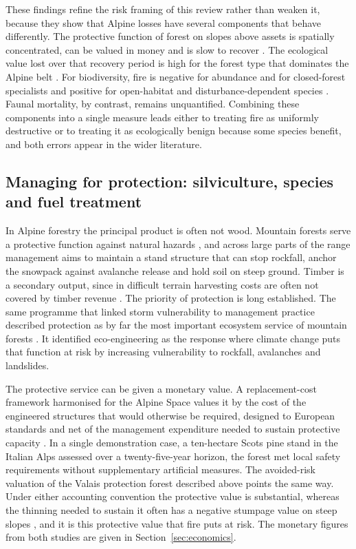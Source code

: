 \documentclass[11pt,a4paper]{article}
\begin{document}
These findings refine the risk framing of this review rather than weaken it, because they show that Alpine losses have several components that behave differently. The protective function of forest on slopes above assets is spatially concentrated, can be valued in money \citep{moos_climate_2021} and is slow to recover \citep{stritih_alternative_2023, degiuli_arrested_2024}. The ecological value lost over that recovery period is high for the forest type that dominates the Alpine belt \citep{arrogantefunes_mapping_2024}. For biodiversity, fire is negative for abundance and for closed-forest specialists and positive for open-habitat and disturbance-dependent species \citep{rey_effects_2019, degiuli_arrested_2024}. Faunal mortality, by contrast, remains unquantified. Combining these components into a single measure leads either to treating fire as uniformly destructive or to treating it as ecologically benign because some species benefit, and both errors appear in the wider literature.

\subsection{Managing for protection: silviculture, species and fuel treatment}

In Alpine forestry the principal product is often not wood. Mountain forests serve a protective function against natural hazards \citep{dinca_timber_2025}, and across large parts of the range management aims to maintain a stand structure that can stop rockfall, anchor the snowpack against avalanche release and hold soil on steep ground. Timber is a secondary output, since in difficult terrain harvesting costs are often not covered by timber revenue \citep{dinca_timber_2025}. The priority of protection is long established. The same programme that linked storm vulnerability to management practice described protection as by far the most important ecosystem service of mountain forests \citep{jandl_management_2013}. It identified eco-engineering as the response where climate change puts that function at risk by increasing vulnerability to rockfall, avalanches and landslides.

The protective service can be given a monetary value. A replacement-cost framework harmonised for the Alpine Space values it by the cost of the engineered structures that would otherwise be required, designed to European standards and net of the management expenditure needed to sustain protective capacity \citep{accastello_asforesee_2019}. In a single demonstration case, a ten-hectare Scots pine stand in the Italian Alps assessed over a twenty-five-year horizon, the forest met local safety requirements without supplementary artificial measures. The avoided-risk valuation of the Valais protection forest described above \citep{moos_climate_2021} points the same way. Under either accounting convention the protective value is substantial, whereas the thinning needed to sustain it often has a negative stumpage value on steep slopes \citep{accastello_asforesee_2019}, and it is this protective value that fire puts at risk. The monetary figures from both studies are given in Section~\ref{sec:economics}.
\end{document}
